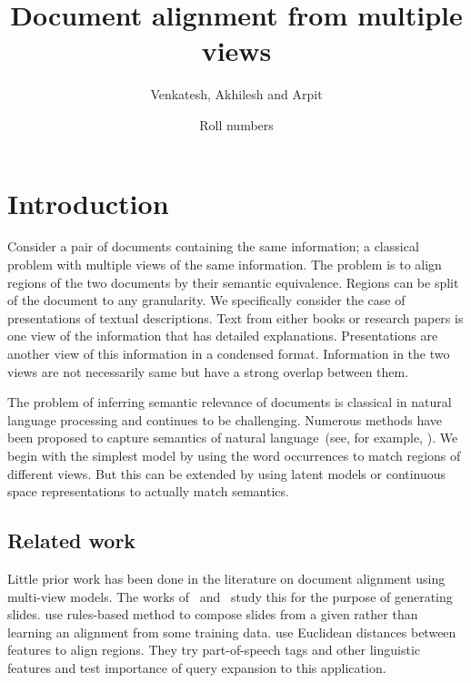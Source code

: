\documentclass[11pt]{article} %
\title{Document alignment from multiple views}
\author{Venkatesh, Akhilesh and Arpit}
\date{Roll numbers} %
\begin{document}
\maketitle
{}

\section{Introduction}
Consider a pair of documents containing the same information; a classical problem with multiple views of the same information. 
The problem is to align regions of the two documents by their semantic equivalence.
Regions can be split of the document to any granularity.
We specifically consider the case of presentations of textual descriptions.
Text from either books or research papers is one view of the information that has detailed explanations.
Presentations are another view of this information in a condensed format.
Information in the two views are not necessarily same but have a strong overlap between them.

 
The problem of inferring semantic relevance of documents is classical in natural language processing and continues to be challenging.
Numerous methods have been proposed to capture semantics of natural language~(see, for example, \cite{jurafsky_book08, mikolov_interspeech10, deerwester_jinsci90}).
We begin with the simplest model by using the word occurrences  to match regions of different views.
But this can be extended by using latent models or continuous space representations to actually match semantics.

\subsection{Related work}
Little prior work has been done in the literature on document alignment using multi-view models.
The works of~\cite{koiti_capp99} and~\cite{beamer_acl09} study this for the purpose of generating slides.
\cite{koiti_capp99} use rules-based method to compose slides from a given rather than learning an alignment from some training data.
\cite{beamer_acl09} use Euclidean distances between features to align regions.
They try part-of-speech tags and other linguistic features and test importance of query expansion to this application.
\end{document}
